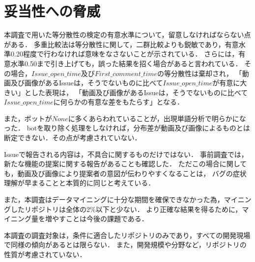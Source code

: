 \section{妥当性への脅威\label{threats}}


本調査で用いた等分散性の検定の有意水準について，留意しなければならない点がある．
多重比較法は等分散性に関して，二群比較よりも鋭敏であり，有意水準0.20程度で行わなければ意味をなさないことが示されている．\cite{Test_Level}
さらには，有意水準0.50まで引き上げても，誤った結果を招く場合があると言われている．
その場合，$Issue\_open\_time$及び$First\_comment\_time$の等分散性は棄却され，
「動画及び画像があるIssueは，そうでないものに比べて$Issue\_open\_time$が有意に大きい」とした表現は，
「動画及び画像があるIssueは，そうでないものに比べて$Issue\_open\_time$に何らかの有意な差をもたらす」となる．

また，ボットが$None$に多くあらわれていることが，出現単語分析で明らかになった．
botを取り除く処理をしなければ，分布差が動画及び画像によるものとは断定できない．その点が考慮されていない．

Issueで報告される内容は，不具合に関するものだけではない．
事前調査では，新たな機能の提案に関する報告があることも確認した．
ただこの場合に関しても，動画及び画像により提案者の意図が伝わりやすくなることは，
バグの症状理解が早まることと本質的に同じと考えている．

また，本調査はデータマイニングに十分な期間を確保できなかった為，マイニングしたリポジトリは全体の2\%以下と少ない．
より正確な結果を得るために，マイニング量を増やすことは今後の課題である．

本調査の調査対象は，条件に適合したリポジトリのみであり，すべての開発現場で同様の傾向があるとは限らない．
また，開発規模や分野など，リポジトリの性質が考慮されていない．